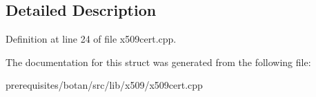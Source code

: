 \subsection{Detailed Description}


Definition at line 24 of file x509cert.\+cpp.



The documentation for this struct was generated from the following file\+:\begin{DoxyCompactItemize}
\item 
prerequisites/botan/src/lib/x509/x509cert.\+cpp\end{DoxyCompactItemize}
